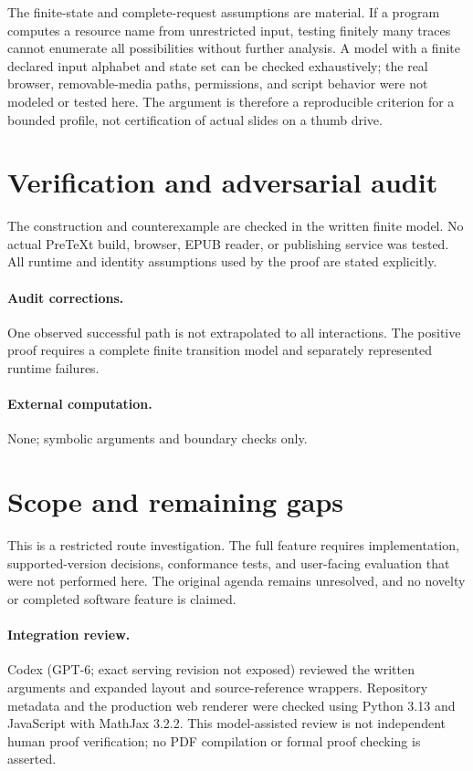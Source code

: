 \documentclass[11pt]{article}
\begin{document}
The finite-state and complete-request assumptions are material. If a program computes a resource name from unrestricted input, testing finitely many traces cannot enumerate all possibilities without further analysis. A model with a finite declared input alphabet and state set can be checked exhaustively; the real browser, removable-media paths, permissions, and script behavior were not modeled or tested here. The argument is therefore a reproducible criterion for a bounded profile, not certification of actual slides on a thumb drive.
\section{Verification and adversarial audit}
The construction and counterexample are checked in the written finite model. No actual PreTeXt build, browser, EPUB reader, or publishing service was tested. All runtime and identity assumptions used by the proof are stated explicitly.
\paragraph{Audit corrections.} One observed successful path is not extrapolated to all interactions. The positive proof requires a complete finite transition model and separately represented runtime failures.
\paragraph{External computation.} None; symbolic arguments and boundary checks only.
\section{Scope and remaining gaps}
This is a restricted route investigation. The full feature requires implementation, supported-version decisions, conformance tests, and user-facing evaluation that were not performed here. The original agenda remains unresolved, and no novelty or completed software feature is claimed.
\paragraph{Integration review.} Codex (GPT-6; exact serving revision not exposed) reviewed the written arguments and expanded layout and source-reference wrappers. Repository metadata and the production web renderer were checked using Python 3.13 and JavaScript with MathJax 3.2.2. This model-assisted review is not independent human proof verification; no PDF compilation or formal proof checking is asserted.
\end{document}
